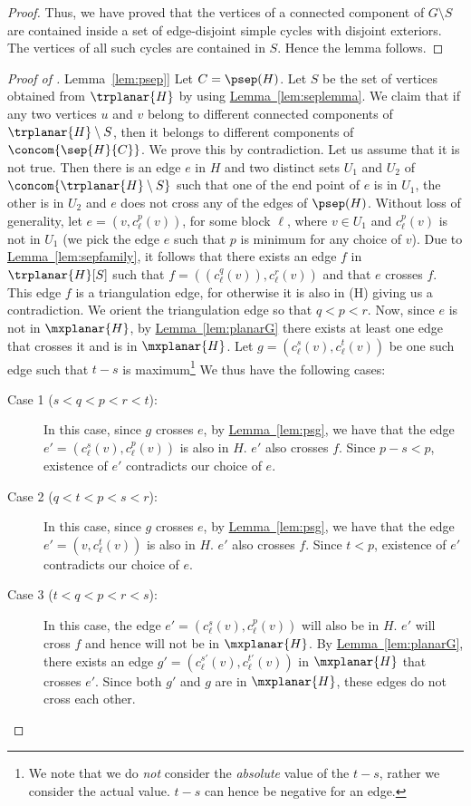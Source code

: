 \documentclass[11pt]{article}
\numberwithin{equation}{section}
\theoremstyle{definition}
\theoremstyle{plain}
\newcommand{\expref}[2]{\hyperref[#2]{#1~\ref{#2}}}
\begin{document}
\begin{proof}
Thus, we have proved that the vertices of a connected component of $G\setminus S$ are contained inside a set of edge-disjoint simple cycles with disjoint exteriors. The vertices of all such cycles are contained in $S$. Hence the lemma follows.
\end{proof}

\begin{proof}[Proof of \expref{Lemma}{lem:psep}]
Let $C = \psep(H)$. Let $S$ be the set of vertices obtained from $\trplanar{H}$ by using \expref{Lemma}{lem:seplemma}. We claim that if any two vertices $u$ and $v$ belong to different connected components of $\trplanar{H} \setminus S$, then it belongs to different components of $\concom{\sep{H}{C}}$. We prove this by contradiction. Let us assume that it is not true. Then there is an edge $e$ in $H$ and two distinct sets $U_1$ and $U_2$ of $\concom{\trplanar{H}\setminus S}$ such that one of the end point of $e$ is in $U_1$, the other is in $U_2$ and $e$ does not cross any of the edges of $\psep(H)$. Without loss of generality, let $e = (v, c_{\ell}^p(v))$, for some block $\ell$, where $v \in U_1$ and $c_{\ell}^p(v)$ is not in $U_1$ (we pick the edge $e$ such that $p$ is minimum for any choice of $v$). Due to \expref{Lemma}{lem:sepfamily}, it follows that there exists an edge $f$ in $\trplanar{H}[S]$ such that $f = ((c_{\ell}^q(v)), c_{\ell}^r(v))$ and that $e$ crosses $f$. This edge $f$ is a triangulation edge, for otherwise it is also %
 in \psep(H) giving us a contradiction. We orient the triangulation edge so that $q < p < r$. Now, since $e$ is not %
 in $\mxplanar{H}$, by \expref{Lemma}{lem:planarG} there exists at least one edge that crosses it and is %
 in $\mxplanar{H}$. Let $g = (c_{\ell}^s(v), c_{\ell}^t(v))$ be one such edge such that $t - s$ is maximum\footnote{We note that we do \emph{not} consider the \emph{absolute} value of the $t-s$, rather we consider the actual value. $t-s$ can hence be negative for an edge.} We thus have the following cases:
\begin{description}
\item[Case 1 ($s<q<p<r<t$):] In this case, since $g$ crosses $e$, by
\expref{Lemma}{lem:psg}, we have that the edge $e' = (c_{\ell}^s(v), c_{\ell}^p(v))$ is also %
 in $H$. $e'$ also crosses $f$. Since $p-s < p$, existence of $e'$ contradicts our choice of $e$.
\item[Case 2 ($q<t<p<s<r$):] In this case, since $g$ crosses $e$, by 
\expref{Lemma}{lem:psg}, we have that the edge $e' = (v, c_{\ell}^t(v))$ is also %
 in $H$. $e'$ also crosses $f$. Since $t < p$, existence of $e'$ contradicts our choice of $e$.
\item[Case 3 ($t<q<p<r<s$):] In this case, the edge $e' = (c_{\ell}^{s}(v), c_{\ell}^p(v))$ will also be %
 in $H$. $e'$ will cross $f$ and hence will not be %
 in $\mxplanar{H}$. By \expref{Lemma}{lem:planarG}, there exists an edge $g' = (c_{\ell}^{s'}(v), c_{\ell}^{t'}(v))$ in $\mxplanar{H}$ that crosses $e'$. Since both $g'$ and $g$ are %
 in $\mxplanar{H}$, these edges %
do not %
cross each other. 


\end{description}
\end{proof}
\end{document}
